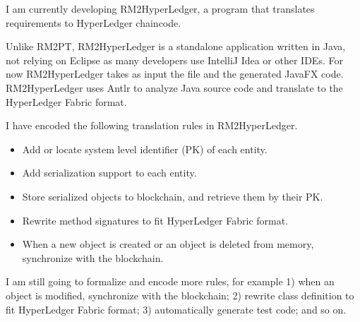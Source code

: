 I am currently developing RM2HyperLedger, a program that translates requirements to HyperLedger chaincode.

Unlike RM2PT, RM2HyperLedger is a standalone application written in Java, not relying on Eclipse as many developers use IntelliJ Idea or other IDEs. For now RM2HyperLedger takes as input the  file and the generated JavaFX code. RM2HyperLedger uses Antlr to analyze Java source code and translate to the HyperLedger Fabric format.

I have encoded the following translation rules in RM2HyperLedger.

\begin{itemize}
\item Add or locate system level identifier (PK) of each entity.
\item Add serialization support to each entity.
\item Store serialized objects to blockchain, and retrieve them by their PK.
\item Rewrite method signatures to fit HyperLedger Fabric format.
\item When a new object is created or an object is deleted from memory, synchronize with the blockchain.
\end{itemize}

I am still going to formalize and encode more rules, for example
1) when an object is modified, synchronize with the blockchain;
2) rewrite class definition to fit HyperLedger Fabric format;
3) automatically generate test code;
and so on.
